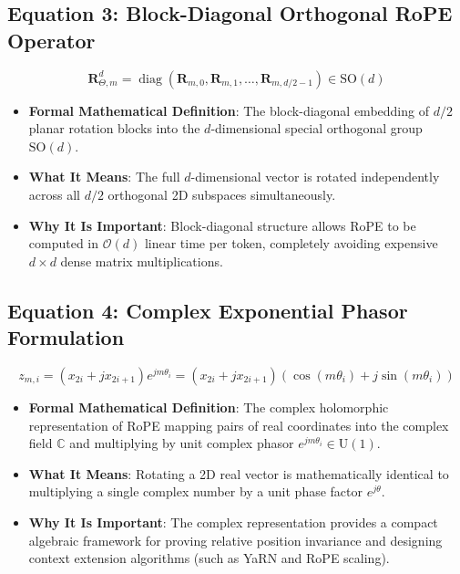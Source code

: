 \documentclass[11pt,a4paper]{article}
\theoremstyle{definition}
\begin{document}
\subsection{\textbf{Equation 3: Block-Diagonal Orthogonal RoPE Operator}}
{\boldmath
\begin{equation}
\mathbf{R}_{\Theta, m}^{d} = \operatorname{diag}\left(\mathbf{R}_{m, 0}, \mathbf{R}_{m, 1}, \dots, \mathbf{R}_{m, d/2-1}\right) \in \mathrm{SO}(d)
\end{equation}
}
\begin{itemize}
    \item \textbf{Formal Mathematical Definition}:
    The block-diagonal embedding of $d/2$ planar rotation blocks into the $d$-dimensional special orthogonal group $\mathrm{SO}(d)$.
    \item \textbf{What It Means}:
    The full $d$-dimensional vector is rotated independently across all $d/2$ orthogonal 2D subspaces simultaneously.
    \item \textbf{Why It Is Important}:
    Block-diagonal structure allows RoPE to be computed in $\mathcal{O}(d)$ linear time per token, completely avoiding expensive $d \times d$ dense matrix multiplications.
\end{itemize}

\subsection{\textbf{Equation 4: Complex Exponential Phasor Formulation}}
{\boldmath
\begin{equation}
z_{m, i} = (x_{2i} + j x_{2i+1}) e^{j m \theta_i} = (x_{2i} + j x_{2i+1}) (\cos(m\theta_i) + j \sin(m\theta_i))
\end{equation}
}
\begin{itemize}
    \item \textbf{Formal Mathematical Definition}:
    The complex holomorphic representation of RoPE mapping pairs of real coordinates into the complex field $\mathbb{C}$ and multiplying by unit complex phasor $e^{j m \theta_i} \in \mathrm{U}(1)$.
    \item \textbf{What It Means}:
    Rotating a 2D real vector is mathematically identical to multiplying a single complex number by a unit phase factor $e^{j \theta}$.
    \item \textbf{Why It Is Important}:
    The complex representation provides a compact algebraic framework for proving relative position invariance and designing context extension algorithms (such as YaRN and RoPE scaling).
\end{itemize}
\end{document}
